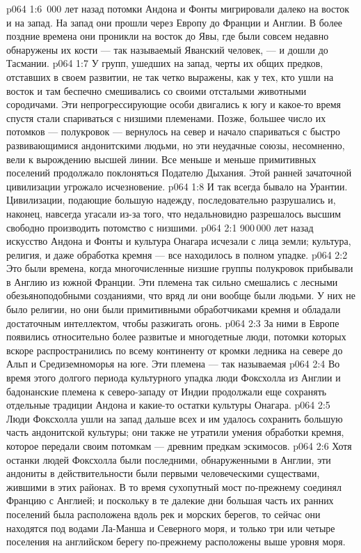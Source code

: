 \vs p064 1:6 \,000 лет назад потомки Андона и Фонты мигрировали далеко на восток и на запад. На запад они прошли через Европу до Франции и Англии. В более поздние времена они проникли на восток до Явы, где были совсем недавно обнаружены их кости --- так называемый Яванский человек, --- и дошли до Тасмании.
\vs p064 1:7 У групп, ушедших на запад, черты их общих предков, отставших в своем развитии, не так четко выражены, как у тех, кто ушли на восток и там беспечно смешивались со своими отсталыми животными сородичами. Эти непрогрессирующие особи двигались к югу и какое\hyp{}то время спустя стали спариваться с низшими племенами. Позже, большее число их потомков --- полукровок --- вернулось на север и начало спариваться с быстро развивающимися андонитскими людьми, но эти неудачные союзы, несомненно, вели к вырождению высшей линии. Все меньше и меньше примитивных поселений продолжало поклоняться Подателю Дыхания. Этой ранней зачаточной цивилизации угрожало исчезновение.
\vs p064 1:8 И так всегда бывало на Урантии. Цивилизации, подающие большую надежду, последовательно разрушались и, наконец, навсегда угасали из\hyp{}за того, что недальновидно разрешалось высшим свободно производить потомство с низшими.
\vs p064 2:1 900\,000 лет назад искусство Андона и Фонты и культура Онагара исчезали с лица земли; культура, религия, и даже обработка кремня --- все находилось в полном упадке.
\vs p064 2:2 Это были времена, когда многочисленные низшие группы полукровок прибывали в Англию из южной Франции. Эти племена так сильно смешались с лесными обезьяноподобными созданиями, что вряд ли они вообще были людьми. У них не было религии, но они были примитивными обработчиками кремня и обладали достаточным интеллектом, чтобы разжигать огонь.
\vs p064 2:3 За ними в Европе появились относительно более развитые и многодетные люди, потомки которых вскоре распространились по всему континенту от кромки ледника на севере до Альп и Средиземноморья на юге. Эти племена --- так называемая 
\vs p064 2:4 Во время этого долгого периода культурного упадка люди Фоксхолла из Англии и бадонанские племена к северо\hyp{}западу от Индии продолжали еще сохранять отдельные традиции Андона и какие\hyp{}то остатки культуры Онагара.
\vs p064 2:5 \pc Люди Фоксхолла ушли на запад дальше всех и им удалось сохранить большую часть андонитской культуры; они также не утратили умения обработки кремня, которое передали своим потомкам --- древним предкам эскимосов.
\vs p064 2:6 Хотя останки людей Фоксхолла были последними, обнаруженными в Англии, эти андониты в действительности были первыми человеческими существами, жившими в этих районах. В то время сухопутный мост по\hyp{}прежнему соединял Францию с Англией; и поскольку в те далекие дни большая часть их ранних поселений была расположена вдоль рек и морских берегов, то сейчас они находятся под водами Ла\hyp{}Манша и Северного моря, и только три или четыре поселения на английском берегу по\hyp{}прежнему расположены выше уровня моря.
